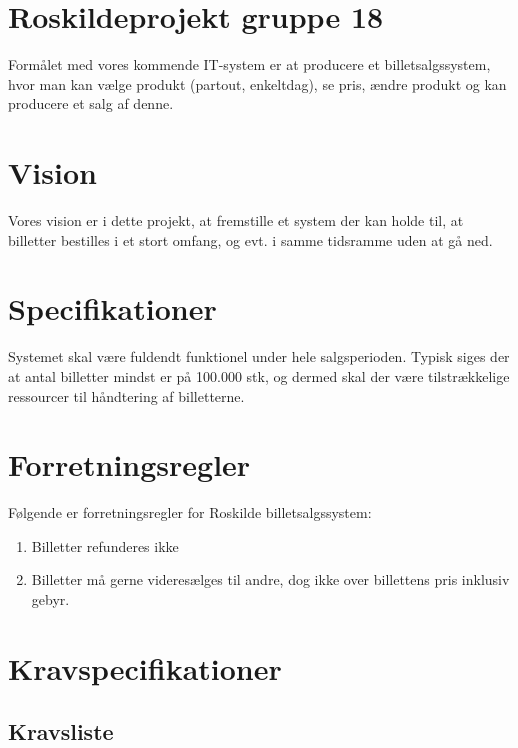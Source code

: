


\section{Roskildeprojekt gruppe 18}
Formålet med vores kommende IT-system er at producere et billetsalgssystem, hvor man kan vælge produkt (partout, enkeltdag), se pris, ændre produkt og kan producere et salg af denne.

\section{Vision}
Vores vision er i dette projekt, at fremstille et system der kan holde til, at billetter bestilles i et stort omfang, og evt. i samme tidsramme uden at gå ned.\\

\section{Specifikationer}
Systemet skal være fuldendt funktionel under hele salgsperioden.
Typisk siges der at antal billetter mindst er på 100.000 stk, og dermed skal der være tilstrækkelige ressourcer til håndtering af billetterne.\\

\section{Forretningsregler}
Følgende er forretningsregler for Roskilde billetsalgssystem:
\begin{enumerate}
    \item Billetter refunderes ikke
    \item Billetter må gerne videresælges til andre, dog ikke over billettens pris inklusiv gebyr.
    \\
\end{enumerate}

\section{Kravspecifikationer}

\subsection{Kravsliste}

